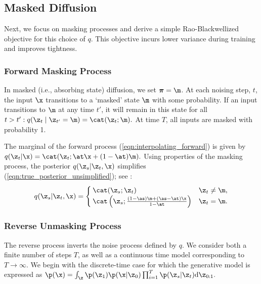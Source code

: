 \documentclass{article} %
\def\prior{\text{$\boldsymbol{\mathit{\pi}}$}}
\begin{document}
\subsection{Masked Diffusion}\label{sec:masked_diffusion}



Next, we focus on masking processes
and derive a simple Rao-Blackwellized objective for this choice of $q$.
This objective incurs lower variance during training and improves tightness.

\subsubsection{Forward  Masking Process}

In masked (i.e., absorbing state) diffusion, we set $\prior = \m$. At each noising step, $t$, the input $\x$ transitions to a `masked' state $\m$ with some probability.
If an input transitions to $\m$ at any time $t'$, it will remain in this state for all $t > t': q(\z_t \mid \z_{t'} = \m) = \cat(\z_t; \m).$
At time $T$, all inputs are masked with probability 1.

The marginal of the forward process (\ref{eqn:interpolating_forward}) is given by 
$q(\z_t| \x) = \cat(\z_t; \at \x + (1 - \at) \m).$
Using properties of the masking process, the posterior $q(\z_s | \z_t, \x)$ simplifies (\ref{eqn:true_posterior_unsimplified}); see :
\begin{align}\label{eqn:true_posterior}
    q(\z_s | \z_t, \x) =
    \begin{cases}
        \cat (\z_s; \z_t) & \z_t \neq \m, \\
        \cat \left( \z_s; \frac{
        (1 - \as)\m + (\as - \at)\x}{1 - \at}\right) & \z_t=\m. 
    \end{cases}
\end{align}

\subsubsection{Reverse Unmasking Process}
\label{sec:reverse-unmasking}


The reverse process 
inverts the noise process defined by $q$.
We consider both a finite number of steps $T$, as well as a continuous time model corresponding to $T \to \infty$.
We begin with the discrete-time case for which the generative model is expressed as
    $
    \p(\x) = \int_\z \p(\z_{1})\p(\x | \z_{0}) \prod_{i=1}^T\p(\z_s | \z_t)\text{d}\z_{0:1}.
    $
\end{document}

